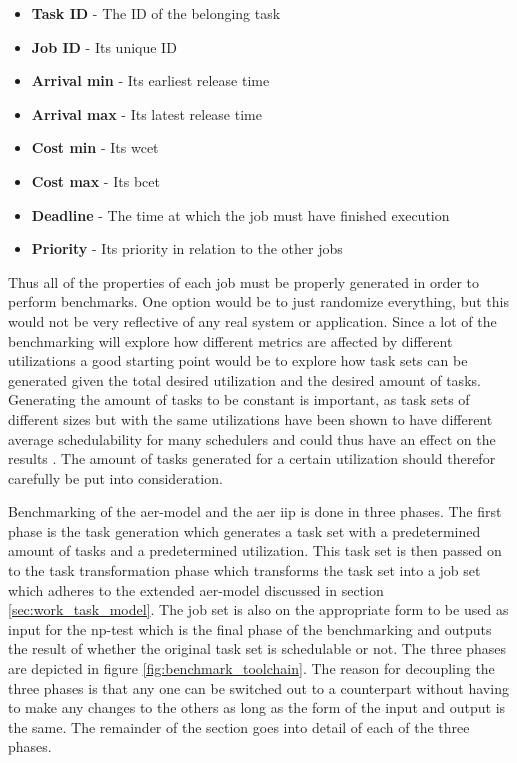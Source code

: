 \documentclass{kththesis}
\begin{document}
\begin{itemize}
    \item \textbf{Task ID} - The ID of the belonging task
    \item \textbf{Job ID} - Its unique ID
    \item \textbf{Arrival min} - Its earliest release time
    \item \textbf{Arrival max} - Its latest release time
    \item \textbf{Cost min} - Its \acrshort{wcet}
    \item \textbf{Cost max} - Its \acrshort{bcet}
    \item \textbf{Deadline} - The time at which the job must have finished execution
    \item \textbf{Priority} - Its priority in relation to the other jobs
\end{itemize}



Thus all of the properties of each job must be properly generated in order to perform benchmarks.
One option would be to just randomize everything, but this would not be very reflective of any real
system or application. Since a lot of the benchmarking will explore how different metrics are
affected by different utilizations a good starting point would be to explore how task sets can be
generated given the total desired utilization and the desired amount of tasks. Generating the
amount of tasks to be constant is important, as task sets of different sizes but with the same
utilizations have been shown to have different average schedulability for many schedulers and could
thus have an effect on the results \parencite{sebestyen_simulation-based_2012}. The amount of tasks
generated for a certain utilization should therefor carefully be put into consideration.

Benchmarking of the \acrshort{aer}-model and the \acrshort{aer} \acrshort{iip} is done in three phases. The first phase is the task
generation which generates a task set with a predetermined amount of tasks and a predetermined utilization. This
task set is then passed on to the task transformation phase which transforms the task set into a job
set which adheres to the extended \acrshort{aer}-model discussed in section \ref{sec:work_task_model}. The job
set is also on the appropriate form to be used as input for the \acrshort{np}-test which is the
final phase of the benchmarking and outputs the result of whether the original task set is schedulable or not. The three
phases are depicted in figure \ref{fig:benchmark_toolchain}. The reason for decoupling the three
phases is that any one can be switched out to a counterpart without having to make any changes to
the others as long as the form of the input and output is the same. The remainder of the section
goes into detail of each of the three phases. 
\end{document}

